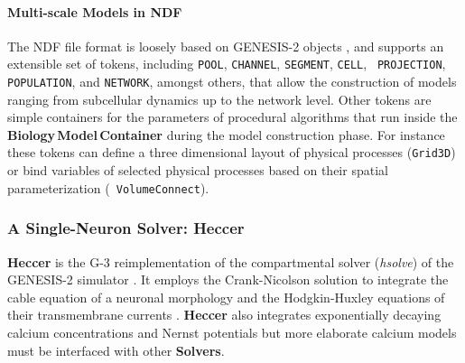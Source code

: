 \documentclass{article}
\begin{document}

\paragraph{Multi-scale Models in NDF}
The NDF file format is loosely based on GENESIS-2 objects
\cite{bower98:_book_genes}, and supports an extensible set of tokens,
including {\tt POOL}, {\tt CHANNEL}, {\tt SEGMENT}, {\tt CELL}, {\tt
  PROJECTION}, {\tt POPULATION}, and {\tt NETWORK}, amongst others,
that allow the construction of models ranging from subcellular
dynamics up to the network level.  Other tokens are simple containers
for the parameters of procedural algorithms that run inside the {\bf
  Biology\,Model\,Container} during the model construction phase.  For
instance these tokens can define a three dimensional layout of
physical processes ({\tt Grid3D}) or bind variables of selected
physical processes based on their spatial parameterization ({\tt
  VolumeConnect}).

\subsubsection{A Single-Neuron Solver: Heccer}

{\bf Heccer} is the G-3 reimplementation of the compartmental solver
({\it hsolve}) of the GENESIS-2 simulator \cite{cornelis02:_tutor}.  It employs the
Crank-Nicolson solution to integrate the cable equation of a neuronal
morphology and the Hodgkin-Huxley equations of their transmembrane
currents \cite{segev95:_theor_found_dendr_funct, hha52, cornelis02:_tutor}.
{\bf Heccer} also integrates exponentially decaying calcium concentrations and Nernst potentials but 
more elaborate calcium models must be interfaced with other {\bf Solvers}.


\end{document}
